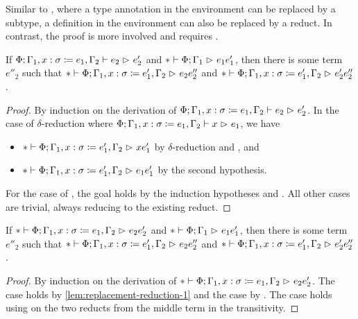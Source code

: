 Similar to ,
where a type annotation in the environment can be replaced by a subtype,
a definition in the environment can also be replaced by a reduct.
In contrast, the proof is more involved and requires .

\begin{lemma} \label{lem:replacement-reduction-1}
If $\Phi; \Gamma_1, x \mathrel{:} \sigma \mathrel{\coloneqq} e_1, \Gamma_2 \mathrel{\vdash} e_2 \mathrel{\rhd}_{} e'_2$
and $* \mathrel{\vdash} \Phi; \Gamma_1 \mathrel{\rhd}_{} e_1{e'_1}$,
then there is some term $e''_2$
such that $* \mathrel{\vdash} \Phi; \Gamma_1, x \mathrel{:} \sigma \mathrel{\coloneqq} e'_1, \Gamma_2 \mathrel{\rhd}_{} e_2{e''_2}$
and $* \mathrel{\vdash} \Phi; \Gamma_1, x \mathrel{:} \sigma \mathrel{\coloneqq} e'_1, \Gamma_2 \mathrel{\rhd}_{} e'_2{e''_2}$.
\end{lemma}

\begin{proof}
By induction on the derivation of
$\Phi; \Gamma_1, x \mathrel{:} \sigma \mathrel{\coloneqq} e_1, \Gamma_2 \mathrel{\vdash} e_2 \mathrel{\rhd}_{} e'_2$.
In the case of $\delta$-reduction where
$\Phi; \Gamma_1, x \mathrel{:} \sigma \mathrel{\coloneqq} e_1, \Gamma_2 \mathrel{\vdash} x \mathrel{\rhd}_{} e_1$,
we have
\begin{itemize}[noitemsep]
  \item $* \mathrel{\vdash} \Phi; \Gamma_1, x \mathrel{:} \sigma \mathrel{\coloneqq} e'_1, \Gamma_2 \mathrel{\rhd}_{} x{e'_1}$ by $\delta$-reduction and , and
  \item $* \mathrel{\vdash} \Phi; \Gamma_1, x \mathrel{:} \sigma \mathrel{\coloneqq} e'_1, \Gamma_2 \mathrel{\rhd}_{} e_1{e'_1}$ by the second hypothesis.
\end{itemize}
For the case of ,
the goal holds by the induction hypotheses and .
All other cases are trivial, always reducing to the existing reduct.
\end{proof}

\begin{lemma} \label{lem:replacement-reduction-2}
If $* \mathrel{\vdash} \Phi; \Gamma_1, x \mathrel{:} \sigma \mathrel{\coloneqq} e_1, \Gamma_2 \mathrel{\rhd}_{} e_2{e'_2}$
and $* \mathrel{\vdash} \Phi; \Gamma_1 \mathrel{\rhd}_{} e_1{e'_1}$,
then there is some term $e''_2$
such that $* \mathrel{\vdash} \Phi; \Gamma_1, x \mathrel{:} \sigma \mathrel{\coloneqq} e'_1, \Gamma_2 \mathrel{\rhd}_{} e_2{e''_2}$
and $* \mathrel{\vdash} \Phi; \Gamma_1, x \mathrel{:} \sigma \mathrel{\coloneqq} e'_1, \Gamma_2 \mathrel{\rhd}_{} e'_2{e''_2}$.
\end{lemma}

\begin{proof}
By induction on the derivation of
$* \mathrel{\vdash} \Phi; \Gamma_1, x \mathrel{:} \sigma \mathrel{\coloneqq} e_1, \Gamma_2 \mathrel{\rhd}_{} e_2{e'_2}$.
The  case holds by \cref{lem:replacement-reduction-1} and
the  case by .
The  case holds using 
on the two reducts from the middle term in the transitivity.
\end{proof}

